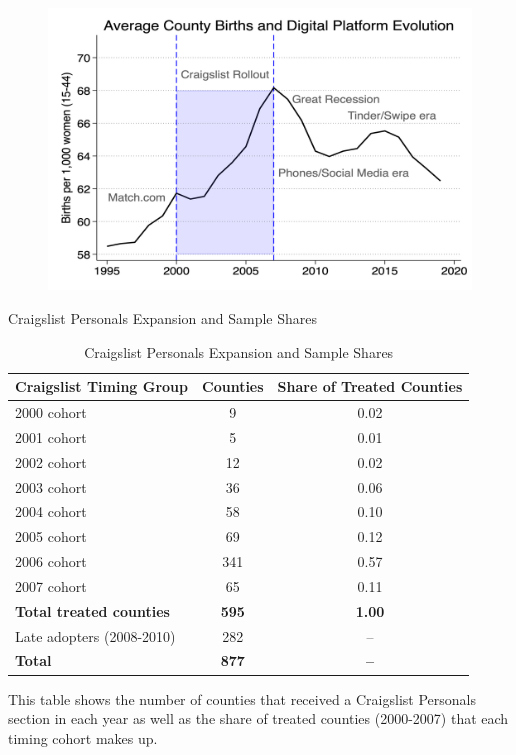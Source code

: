 \documentclass{beamer}
\begin{document}
\begin{frame}

\begin{figure}
    \centering
    \includegraphics[height=0.6\textheight]{./lecture_includes/birth_rates_digital_timeline.png}
\end{figure}

\end{frame}





\begin{frame}[shrink=20]{Craigslist Personals Expansion and Sample Shares}
\begin{table}[htbp]\centering
\footnotesize
\caption{Craigslist Personals Expansion and Sample Shares}
\label{tab:table1}
\begin{threeparttable}
\begin{tabular}{lcc}
\toprule
\textbf{Craigslist Timing Group} & \textbf{Counties} & \textbf{Share of Treated Counties} \\
\midrule
2000 cohort & 9 & 0.02 \\
2001 cohort & 5 & 0.01 \\
2002 cohort & 12 & 0.02 \\
2003 cohort & 36 & 0.06 \\
2004 cohort & 58 & 0.10 \\
2005 cohort & 69 & 0.12 \\
2006 cohort & 341 & 0.57 \\
2007 cohort & 65 & 0.11 \\
\midrule
\textbf{Total treated counties} & \textbf{595} & \textbf{1.00} \\
\midrule
Late adopters (2008-2010) & 282 & -- \\
\midrule
\textbf{Total} & \textbf{877} & \textbf{--} \\
\bottomrule
\end{tabular}
\begin{tablenotes}
\footnotesize
\item This table shows the number of counties that received a Craigslist Personals section in each year as well as the share of treated counties (2000-2007) that each timing cohort makes up.
\end{tablenotes}
\end{threeparttable}
\end{table}
\end{frame}
\end{document}
